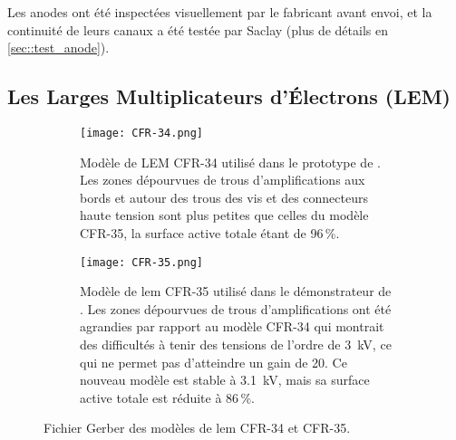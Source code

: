       Les anodes ont été inspectées visuellement par le fabricant avant envoi, et la continuité de leurs canaux a été testée par Saclay (plus de détails en \autoref{sec::test_anode}).
        
    \subsection{Les Larges Multiplicateurs d'Électrons (LEM)}\label{sec::LEM}

      \begin{figure}[htbp]
        \begin{subfigure}[t]{0.48\textwidth}
          \centering
          \captionsetup{width=.95\linewidth}
          \texttt{[image: CFR-34.png]}
          \caption{\label{fig::cfr34}Modèle de LEM CFR-34 utilisé dans le prototype de \TOO{}. Les zones dépourvues de trous d'amplifications aux bords et autour des trous des vis et des connecteurs haute tension sont plus petites que celles du modèle CFR-35, la surface active totale étant de 96\,\%.}
        \end{subfigure}
        \hfill
        \begin{subfigure}[t]{0.48\textwidth}
          \centering
          \captionsetup{width=.95\linewidth}
          \texttt{[image: CFR-35.png]}
          \caption{\label{fig::cfr35}Modèle de \gls{lem} CFR-35 utilisé dans le démonstrateur de \SSS{}. Les zones dépourvues de trous d'amplifications ont été agrandies par rapport au modèle CFR-34 qui montrait des difficultés à tenir des tensions de l'ordre de \SI{3}{\kilo\volt}, ce qui ne permet pas d'atteindre un gain de 20. Ce nouveau modèle est stable à \SI{3.1}{\kilo\volt}, mais sa surface active totale est réduite à 86\,\%.}
        \end{subfigure}
        \caption[Modèle de LEM CFR-34 et CFR-35]{Fichier Gerber des modèles de \gls{lem} CFR-34 et CFR-35.}
        \label{fig::cfrs}
      \end{figure}

            
